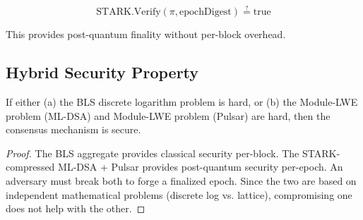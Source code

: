 $$\text{STARK.Verify}(\pi, \text{epochDigest}) \stackrel{?}{=} \text{true}$$

This provides post-quantum finality without per-block overhead.

\subsection{Hybrid Security Property}

\begin{theorem}
If either (a) the BLS discrete logarithm problem is hard, or (b) the Module-LWE problem (ML-DSA) and Module-LWE problem (Pulsar) are hard, then the consensus mechanism is secure.
\end{theorem}

\begin{proof}
The BLS aggregate provides classical security per-block. The STARK-compressed ML-DSA + Pulsar provides post-quantum security per-epoch. An adversary must break both to forge a finalized epoch. Since the two are based on independent mathematical problems (discrete log vs. lattice), compromising one does not help with the other.
\end{proof}

